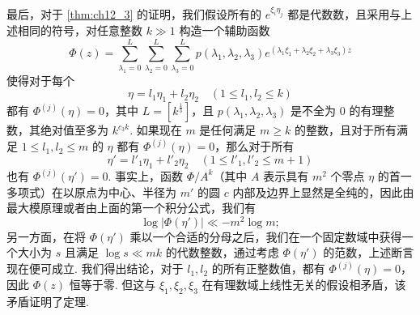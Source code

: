 最后，对于 \autoref{thm:ch12_3} 的证明，我们假设所有的 $e^{\xi_i\eta_j}$ 都是代数数，且采用与上述相同的符号，对任意整数 $k \gg 1$ 构造一个辅助函数
\[\Phi(z) = \sum_{\lambda_1=0}^{L} \sum_{\lambda_2=0}^{L} \sum_{\lambda_3=0}^{L} p(\lambda_1, \lambda_2, \lambda_3) e^{(\lambda_1 \xi_1 + \lambda_2 \xi_2 + \lambda_3 \xi_3) z}\]
使得对于每个
\[\eta = l_1 \eta_1 + l_2 \eta_2 \quad (1 \leqslant l_1, l_2 \leqslant k)\]
都有 $\Phi^{(j)}(\eta) = 0$，其中 $L = [k^{\frac{1}{3}}]$，且 $p(\lambda_1, \lambda_2, \lambda_3)$ 是不全为 0 的有理整数，其绝对值至多为 $k^{c_3 k}$. 如果现在 $m$ 是任何满足 $m \ge k$ 的整数，且对于所有满足 $1 \le l_1, l_2 \le m$ 的 $\eta$ 都有 $\Phi^{(j)}(\eta) = 0$，那么对于所有
\[\eta' = l'_1 \eta_1 + l'_2 \eta_2 \quad (1 \leqslant l'_1, l'_2 \leqslant m+1)\]
也有 $\Phi^{(j)}(\eta') = 0$. 事实上，函数 $\Phi/A^k$（其中 $A$ 表示具有 $m^2$ 个零点 $\eta$ 的首一多项式）在以原点为中心、半径为 $m'$ 的圆 $c$ 内部及边界上显然是全纯的，因此由最大模原理或者由上面的第一个积分公式，我们有
\[\log |\Phi(\eta')| \ll -m^2 \log m;\]
另一方面，在将 $\Phi(\eta')$ 乘以一个合适的分母之后，我们在一个固定数域中获得一个大小为 $s$ 且满足 $\log s \ll m k$ 的代数整数，通过考虑 $\Phi(\eta')$ 的范数，上述断言现在便可成立. 我们得出结论，对于 $l_1, l_2$ 的所有正整数值，都有 $\Phi^{(j)}(\eta) = 0$，因此 $\Phi(z)$ 恒等于零. 但这与 $\xi_1, \xi_2, \xi_3$ 在有理数域上线性无关的假设相矛盾，该矛盾证明了定理.
